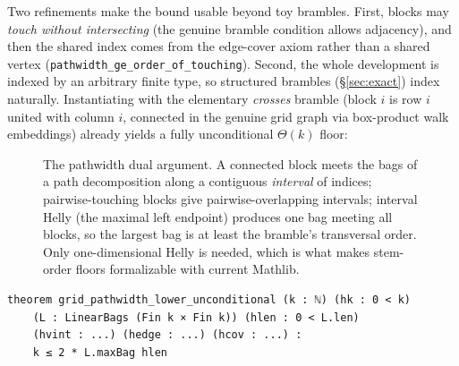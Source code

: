 \documentclass[sigplan,10pt,screen,review,anonymous]{acmart}
\begin{document}
Two refinements make the bound usable beyond toy brambles. First, blocks may
\emph{touch without intersecting} (the genuine bramble condition allows adjacency),
and then the shared index comes from the edge-cover axiom rather than a shared vertex
(\lstinline|pathwidth_ge_order_of_touching|). Second, the whole development is indexed by
an arbitrary finite type, so structured brambles (\S\ref{sec:exact}) index naturally.
Instantiating with the elementary \emph{crosses} bramble (block $i$ is row $i$ united
with column $i$, connected in the genuine grid graph via box-product walk embeddings)
already yields a fully unconditional $\Theta(k)$ floor:
\begin{figure}[t]
\centering
{}
\caption{The pathwidth dual argument. A connected block meets the bags of a path
decomposition along a contiguous \emph{interval} of indices; pairwise-touching blocks give
pairwise-overlapping intervals; interval Helly (the maximal left endpoint) produces one bag
meeting all blocks, so the largest bag is at least the bramble's transversal order. Only
one-dimensional Helly is needed, which is what makes stem-order floors formalizable with
current Mathlib.}
\label{fig:helly}
\end{figure}

\begin{lstlisting}
theorem grid_pathwidth_lower_unconditional (k : ℕ) (hk : 0 < k)
    (L : LinearBags (Fin k × Fin k)) (hlen : 0 < L.len)
    (hvint : ...) (hedge : ...) (hcov : ...) :
    k ≤ 2 * L.maxBag hlen
\end{lstlisting}

\end{document}
